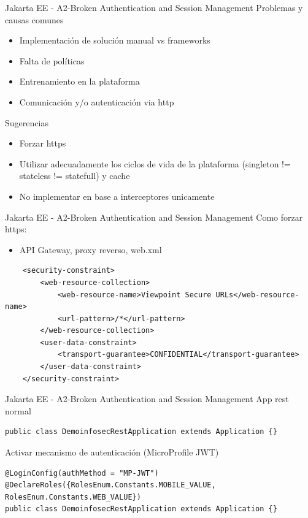 \documentclass[aspectratio=169]{beamer}
\begin{document}
\begin{frame}{Jakarta EE - A2-Broken Authentication and Session Management}
    Problemas y causas comunes
    \begin{itemize}
        \item Implementación de solución manual vs frameworks
        \item Falta de políticas
        \item Entrenamiento en la plataforma
        \item Comunicación y/o autenticación via http
    \end{itemize}

    Sugerencias
    \begin{itemize}
        \item Forzar https
        \item Utilizar adecuadamente los ciclos de vida de la plataforma (singleton != stateless != statefull) y cache
        \item No implementar en base a interceptores unicamente
    \end{itemize}
\end{frame}


\begin{frame}[fragile]{Jakarta EE - A2-Broken Authentication and Session Management}
Como forzar https:

\begin{itemize}
\item API Gateway, proxy reverso, web.xml
\end{itemize}

    \begin{lstlisting}
    <security-constraint>
        <web-resource-collection>
            <web-resource-name>Viewpoint Secure URLs</web-resource-name>
            <url-pattern>/*</url-pattern>
        </web-resource-collection>
        <user-data-constraint>
            <transport-guarantee>CONFIDENTIAL</transport-guarantee>
        </user-data-constraint>
    </security-constraint>
    \end{lstlisting}
\end{frame}




\begin{frame}[fragile]{Jakarta EE - A2-Broken Authentication and Session Management}
App rest normal
\begin{lstlisting}
public class DemoinfosecRestApplication extends Application {}
\end{lstlisting}

Activar mecanismo de autenticación (MicroProfile JWT)
\begin{lstlisting}
@LoginConfig(authMethod = "MP-JWT")
@DeclareRoles({RolesEnum.Constants.MOBILE_VALUE, RolesEnum.Constants.WEB_VALUE})
public class DemoinfosecRestApplication extends Application {}
\end{lstlisting}

\end{frame}
\end{document}
